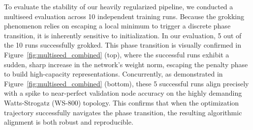 \documentclass{article}
\begin{document}
\begin{table}[H]
  \caption{Comparison of Strict Graph Accuracy and Node Accuracy (\%) between the SALSA-CLRS Baseline PGN (with hints) and Our PGN Pipeline. Models were trained on ER graphs of $N \le 16$.}
  \label{results-table}
  \centering
\end{table}

To evaluate the stability of our heavily regularized pipeline, we conducted a multiseed evaluation across 10 independent training runs. Because the grokking phenomenon relies on escaping a local minimum to trigger a discrete phase transition, it is inherently sensitive to initialization. In our evaluation, 5 out of the 10 runs successfully grokked. This phase transition is visually confirmed in Figure~\ref{fig:multiseed_combined} (top), where the successful runs exhibit a sudden, sharp increase in the network's weight norm, escaping the penalty phase to build high-capacity representations. Concurrently, as demonstrated in Figure~\ref{fig:multiseed_combined} (bottom), these 5 successful runs align precisely with a spike to near-perfect validation node accuracy on the highly demanding Watts-Strogatz (WS-800) topology. This confirms that when the optimization trajectory successfully navigates the phase transition, the resulting algorithmic alignment is both robust and reproducible.
\end{document}

